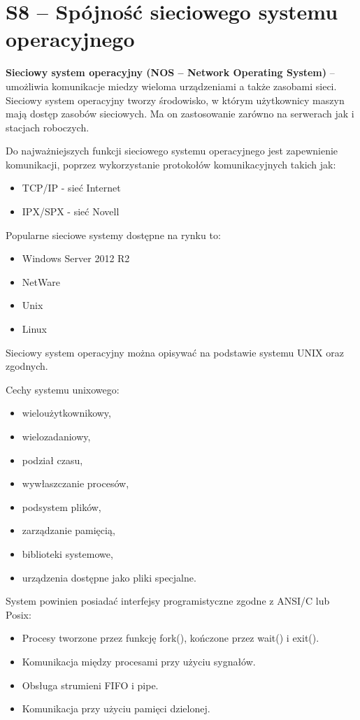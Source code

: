 \section{S8 -- Spójność sieciowego systemu operacyjnego}


\textbf{Sieciowy system operacyjny (NOS -- Network Operating System)} -- umożliwia komunikacje miedzy wieloma urządzeniami a także zasobami sieci. Sieciowy system operacyjny tworzy środowisko, w którym użytkownicy maszyn mają dostęp zasobów sieciowych. Ma on zastosowanie zarówno na serwerach jak i stacjach roboczych.

Do najważniejszych funkcji sieciowego systemu operacyjnego jest zapewnienie komunikacji, poprzez wykorzystanie protokołów komunikacyjnych takich jak:
\begin{itemize}
    \item TCP/IP - sieć Internet
    \item IPX/SPX - sieć Novell 
\end{itemize}

Popularne sieciowe systemy dostępne na rynku to:
\begin{itemize}
    \item Windows Server 2012 R2
    \item NetWare
    \item Unix
    \item Linux
\end{itemize}

Sieciowy system operacyjny można opisywać na podstawie systemu UNIX oraz zgodnych. 

Cechy systemu unixowego:
\begin{itemize}
    \item wieloużytkownikowy,
    \item wielozadaniowy,
    \item podział czasu,
    \item wywłaszczanie procesów,
    \item podsystem plików,
    \item zarządzanie pamięcią,
    \item biblioteki systemowe,
    \item urządzenia dostępne jako pliki specjalne.
\end{itemize}

System powinien posiadać interfejsy programistyczne zgodne z ANSI/C lub Posix:
\begin{itemize}
    \item Procesy tworzone przez funkcję fork(), kończone przez wait() i exit().
    \item Komunikacja między procesami przy użyciu sygnałów.
    \item Obsługa strumieni FIFO i pipe.
    \item Komunikacja przy użyciu pamięci dzielonej.
\end{itemize}

